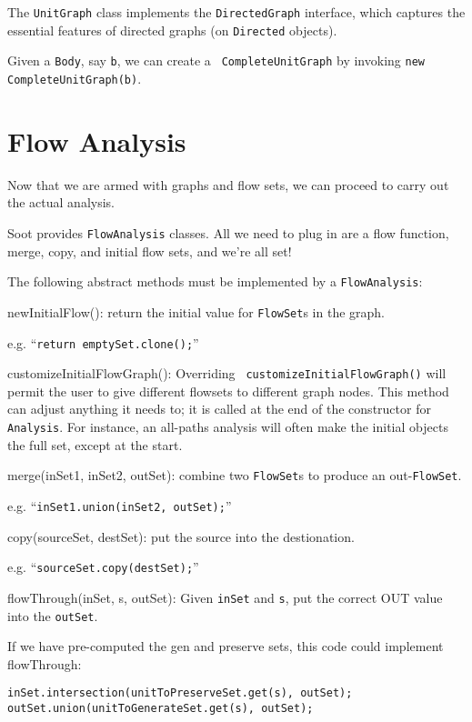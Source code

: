 \documentclass{article}
\begin{document}
The {\tt UnitGraph} class implements the {\tt DirectedGraph} interface,
which captures the essential features of directed graphs (on {\tt Directed}
objects).

Given a {\tt Body}, say {\tt b}, we can create a {\tt
CompleteUnitGraph} by invoking {\tt new CompleteUnitGraph(b)}.

\section{Flow Analysis}

Now that we are armed with graphs and flow sets, we can proceed to
carry out the actual analysis.

Soot provides {\tt FlowAnalysis} classes.  All we need to plug in are
a flow function, merge, copy, and initial flow sets, and we're all set!

The following abstract methods must be implemented by a {\tt FlowAnalysis}:

\begin{description}
\item{newInitialFlow():} return the initial value for {\tt FlowSet}s in
the graph.

e.g. ``{\tt return emptySet.clone();}''

\item{customizeInitialFlowGraph():} Overriding {\tt
customizeInitialFlowGraph()} will permit the user to give different
flowsets to different graph nodes.  This method can adjust anything it
needs to; it is called at the end of the constructor for {\tt
Analysis}.  For instance, an all-paths analysis will often make the
initial objects the full set, except at the start.

\item{merge(inSet1, inSet2, outSet):} combine two {\tt FlowSet}s to produce
an out-{\tt FlowSet}.

e.g. ``{\tt inSet1.union(inSet2, outSet);}''

\item{copy(sourceSet, destSet):} put the source into the destionation.

e.g. ``{\tt sourceSet.copy(destSet);}''

\item{flowThrough(inSet, s, outSet):} Given {\tt inSet} and {\tt s}, put
the correct OUT value into the {\tt outSet}.

If we have pre-computed the gen and preserve sets, this code could implement
flowThrough:
\begin{verbatim}
inSet.intersection(unitToPreserveSet.get(s), outSet);
outSet.union(unitToGenerateSet.get(s), outSet);
\end{verbatim}
\end{description}
\end{document}
